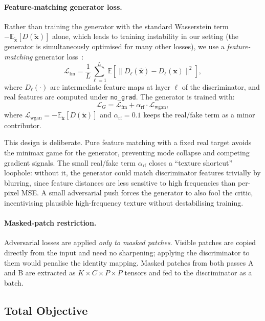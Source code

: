 \documentclass{article}
\newcommand{\EE}{\mathbb{E}}
\newcommand{\bx}{\mathbf{x}}
\begin{document}
\paragraph{Feature-matching generator loss.}
Rather than training the generator with the standard Wasserstein term
$-\EE_{\tilde{\bx}}[D(\tilde{\bx})]$ alone, which leads to training instability
in our setting (the generator is simultaneously optimised for many other losses),
we use a \emph{feature-matching} generator loss~\cite{salimans2016improved}:
\begin{equation}
  \mathcal{L}_\mathrm{fm} = \frac{1}{L} \sum_{\ell=1}^{L}
  \EE\!\left[\|D_\ell(\hat{\bx}) - D_\ell(\bx)\|^2\right],
\end{equation}
where $D_\ell(\cdot)$ are intermediate feature maps at layer $\ell$ of the
discriminator, and real features are computed under \texttt{no\_grad}.  The
generator is trained with:
\begin{equation}
  \mathcal{L}_G = \mathcal{L}_\mathrm{fm} + \alpha_\mathrm{rf} \cdot \mathcal{L}_\mathrm{wgan},
  \label{eq:gloss}
\end{equation}
where $\mathcal{L}_\mathrm{wgan} = -\EE_{\tilde{\bx}}[D(\tilde{\bx})]$ and
$\alpha_\mathrm{rf} = 0.1$ keeps the real/fake term as a minor contributor.

This design is deliberate.  Pure feature matching with a fixed real target avoids
the minimax game for the generator, preventing mode collapse and competing gradient
signals.  The small real/fake term $\alpha_\mathrm{rf}$ closes a ``texture shortcut''
loophole: without it, the generator could match discriminator features trivially
by blurring, since feature distances are less sensitive to high frequencies than
per-pixel MSE.  A small adversarial push forces the generator to also fool the
critic, incentivising plausible high-frequency texture without destabilising training.

\paragraph{Masked-patch restriction.}
Adversarial losses are applied \emph{only to masked patches}.  Visible patches
are copied directly from the input and need no sharpening; applying the discriminator
to them would penalise the identity mapping.  Masked patches from both passes A
and B are extracted as $K \times C \times P \times P$ tensors and fed to the
discriminator as a batch.

\subsection{Total Objective}
\label{sec:total}
\end{document}
